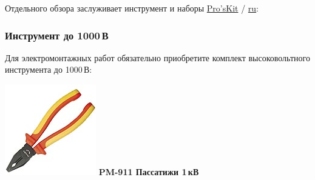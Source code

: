 \documentclass{magazine}
\begin{document}
{Отдельного обзора заслуживает инструмент и наборы
\href{http://www.proskit.com/}{Pro'sKit}
 / \href{http://www.proskit.msk.ru/index.html}{ru}:

\begin{multicols}{2}

\subsubsection{Инструмент до 1000\,В}

Для электромонтажных работ обязательно приобретите комплект
высоковольтного инструмента до 1000\,В:

\noindent\includegraphics[width=\columnwidth]{fig/00/pros/PM-911.jpg}
\textbf{PM-911 Пассатижи 1\,кВ}


\end{multicols}}
\end{document}

